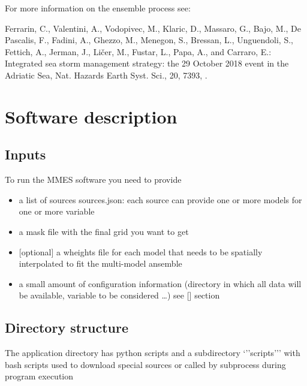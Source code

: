 \documentclass[letterpaper,10pt,english]{sphinxmanual}
\begin{document}
For more information on the ensemble process see:

Ferrarin, C., Valentini, A., Vodopivec, M., Klaric, D., Massaro, G., Bajo, M., De Pascalis, F., Fadini, A., Ghezzo, M., Menegon, S., Bressan, L., Unguendoli, S., Fettich, A., Jerman, J., Ličer, M., Fustar, L., Papa, A., and Carraro, E.:
Integrated sea storm management strategy: the 29 October 2018 event in the Adriatic Sea, Nat. Hazards Earth Syst. Sci., 20, 73\textendash{}93, .


\chapter{Software description}
\label{\detokenize{howitworks/index:software-description}}\label{\detokenize{howitworks/index:howitworks}}\label{\detokenize{howitworks/index::doc}}

\section{Inputs}
\label{\detokenize{howitworks/index:inputs}}
To run the MMES software you need to provide
\begin{itemize}
\item {} 
a list of sources sources.json: each source can provide one or more models for one or more variable

\item {} 
a mask file with the final grid you want to get

\item {} 
{[}optional{]} a wheights file for each model that needs to be spatially interpolated to fit the multi-model ansemble

\item {} 
a small amount of configuration information (directory in which all data will be available, variable to be considered …) see {[}{\hyperref[\detokenize{configuration/index:gen-config}]{}}{]} section

\end{itemize}


\section{Directory structure}
\label{\detokenize{howitworks/index:directory-structure}}\label{\detokenize{howitworks/index:dir-structure}}
The application directory has python scripts and a subdirectory ‘’’scripts’’’ with bash scripts used to download special sources or called by subprocess during program execution
\end{document}
